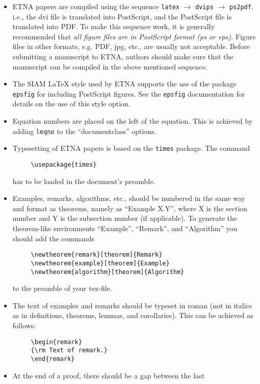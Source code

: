 \documentclass[10pt]{article}
\begin{document}
\begin{itemize}
\item ETNA papers are compiled using the sequence {\tt latex} $\rightarrow$
{\tt dvips} $\rightarrow$ {\tt ps2pdf}, i.e., the dvi file is
translated into PostScript, and the PostScript file is translated
into PDF. To make this sequence work, it is generally recommended
that {\em all figure files are in PostScript format (ps or eps).}
Figure files in other formats, e.g. PDF, jpg, etc., are usually not
acceptable. Before submitting a manuscript to ETNA, authors should
make sure that the manuscript can be compiled in the above mentioned
sequence.
%
\item The SIAM {\LaTeX} style used by ETNA supports the
use of the package {\tt epsfig} for including PostScript figures. See
the {\tt epsfig} documentation for details on the use of this style option.
%
\item Equation numbers are placed on the left of the equation. This is
achieved by adding {\tt leqno} to the ``documentclass'' options.
%
\item Typesetting of ETNA papers is based on the {\tt times} package.
The command
\begin{verbatim}     \usepackage{times}\end{verbatim}
has to be loaded in the document's preamble.
%
%
\item Examples, remarks, algorithms, etc., should be numbered in the
same way and format as theorems, namely as ``Example X.Y'', where X is the section
number and Y is the subsection number (if applicable). To generate the theorem-like
environments ``Example'', ``Remark'', and ``Algorithm'' you should add the commands
\begin{verbatim}
     \newtheorem{remark}[theorem]{Remark}
     \newtheorem{example}[theorem]{Example}
     \newtheorem{algorithm}[theorem]{Algorithm}
\end{verbatim}
to the preamble of your tex-file.
%
\item The text of examples and remarks should be typeset in roman
(not in italics as in definitions, theorems, lemmas, and corollaries).
This can be achieved as follows:
\begin{verbatim}
     \begin{remark}
     {\rm Text of remark.}
     \end{remark}
\end{verbatim}
%
\item  At the end of a proof, there should be a gap between the last

\end{itemize}
\end{document}
